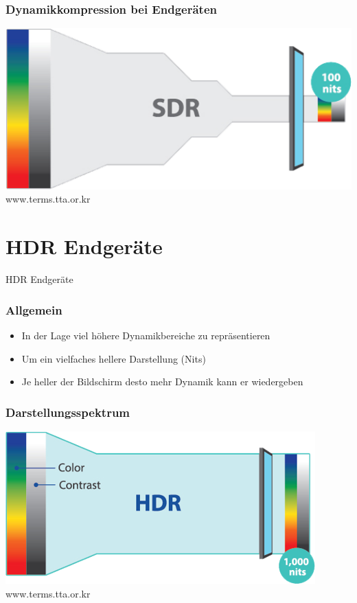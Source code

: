 \documentclass{beamer}
\begin{document}
	\begin{frame}
	\frametitle{Dynamikkompression bei Endgeräten}
	\begin{center}
		\includegraphics[scale=0.45]{img/bild7.png}
		\tiny www.terms.tta.or.kr
	\end{center}
	\end{frame}

	\section{HDR Endgeräte}
	\begin{frame}
		\begin{center}
			\Huge HDR Endgeräte
		\end{center}
	\end{frame}
	\begin{frame}
	\frametitle{Allgemein}
	\begin{itemize}[label=\textcolor{red!65!black}{\textbullet}]
		\item In der Lage viel höhere Dynamikbereiche zu repräsentieren
		\item Um ein vielfaches hellere Darstellung (Nits)
		\item Je heller der Bildschirm desto mehr Dynamik kann er wiedergeben
	\end{itemize}
	\end{frame}

	\begin{frame}
	\frametitle{Darstellungsspektrum}
	\begin{center}
		\includegraphics[scale=0.45]{img/bild8.png}
		\tiny www.terms.tta.or.kr
	\end{center}
	\end{frame}
\end{document}
